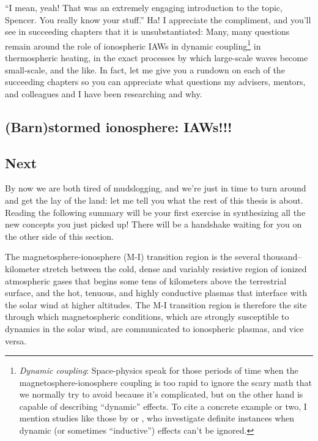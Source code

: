 ``I mean, yeah! That was an extremely engaging introduction to the topic,
Spencer. You really know your stuff.'' Ha! I appreciate the compliment, and
you'll see in succeeding chapters that it is unsubstantiated: Many, many
questions remain around the role of ionospheric IAWs in dynamic
coupling\footnote{\textit{Dynamic coupling}: Space-physics speak for those periods of
  time when the magnetosphere-ionosphere coupling is too rapid to ignore the
  scary math that we normally try to avoid because it's complicated, but on the
  other hand is capable of describing ``dynamic'' effects. To cite a concrete
  example or two, I mention studies like those by \citet{Mishin2015} or
  \citet{Verkhoglyadova2016}, who investigate definite instances when dynamic
  (or sometimes ``inductive'') effects can't be ignored.} in thermospheric
heating, in the exact processes by which large-scale waves become small-scale,
and the like. In fact, let me give you a rundown on each of the succeeding
chapters so you can appreciate what questions my advisers, mentors, and
colleagues and I have been researching and why.

\subsection{(Barn)stormed ionosphere: IAWs!!!}


\subsection{Next }


By now we are both tired of mudslogging, and we're just in time to turn around
and get the lay of the land: let me tell you what the rest of this thesis is
about. Reading the following summary will be your first exercise in synthesizing
all the new concepts you just picked up! There will be a handshake waiting for
you on the other side of this section.

The magnetosphere-ionosphere (M-I) transition region is the several
thousand--kilometer stretch between the cold, dense and variably resistive
region of ionized atmospheric gases that begins some tens of kilometers above
the terrestrial surface, and the hot, tenuous, and highly conductive plasmas
that interface with the solar wind at higher altitudes. The M-I transition
region is therefore the site through which magnetospheric conditions, which are
strongly susceptible to dynamics in the solar wind, are communicated to
ionospheric plasmas, and vice versa.

